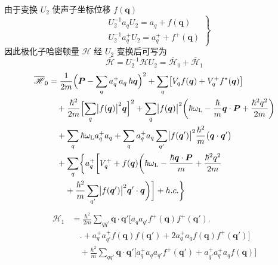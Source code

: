 由于变换 $U_{2}$ 使声子坐标位移 $f(\boldsymbol{q})$
\begin{equation}
\left.
\begin{aligned}
  &U_{2}^{-1}a_{q}U_{2}=a_{q}+f(\boldsymbol{q})\\
  &U_{2}^{-1}a_{q}^{+}U_{2}=a_{q}^{+}+f^{+}(\boldsymbol{q})
\end{aligned}\right\}
\end{equation}
因此极化子哈密顿量 $\mathscr{H}$ 经 $U_{2}$ 变换后可写为
\begin{equation}
  \overline{\mathscr{H}}=U_{2}^{-1}\mathscr{H}U_{2}
  =\overline{\mathscr{H}}_{0}+\overline{\mathscr{H}}_{1}
\end{equation}
\begin{equation}
\begin{aligned}
  \overline{\mathscr{H}}_{0}&=\frac{1}{2m}\Bigl(\boldsymbol{P}
  -\sum_{q}a_{q}^{+}a_{q}\,\hbar\boldsymbol{q}\Bigr)^{2}
  +\sum_{q}\bigl[V_{q}f(\boldsymbol{q})
  +V_{q}^{+}f^{*}(\boldsymbol{q})\bigr]\\
  &\quad+\frac{\hbar^{2}}{2m}\Bigl[\sum_{q}\bigl|f(\boldsymbol{q})\bigr|^{2}
  \boldsymbol{q}\Bigr]^{2}
  +\sum_{q}\bigl|f(\boldsymbol{q})\bigr|^{2}\biggl(\hbar\omega_{\mathrm L}
  -\frac{\hbar}{m}\boldsymbol{q}\cdot\boldsymbol{P}
  +\frac{\hbar^{2}q^{2}}{2m}\biggr)\\
  &\quad+\sum_{q}\hbar\omega_{\mathrm L}a_{q}^{+}a_{q}
  +\sum_{q}a_{q}^{+}a_{q}\sum_{q'}\bigl|f(\boldsymbol{q}')\bigr|^{2}
  \frac{\hbar^{2}}{m}\bigl(\boldsymbol{q}\cdot\boldsymbol{q}'\bigr)\\
  &\quad+\sum_{q}\biggl\{a_{q}^{+}\biggl[V_{q}^{+}+f(\boldsymbol{q})
  \biggl(\hbar\omega_{\mathrm L}-\frac{\hbar\boldsymbol{q}\cdot\boldsymbol{P}}{m}
  +\frac{\hbar^{2}q^{2}}{2m}\\
  &\qquad+\frac{\hbar^{2}}{m}\sum_{q'}\bigl|f(\boldsymbol{q}')\bigr|^{2}
  \boldsymbol{q}'\cdot\boldsymbol{q}\biggr)\biggr]+h.c.\biggr\}
\end{aligned}
\end{equation}
\begin{equation}
\begin{aligned}
  \mathscr{H}_{1}&=\frac{\hbar^{2}}{2m}\sum_{qq'}
  \boldsymbol{q}\cdot\boldsymbol{q}'
  \bigl[a_{q}a_{q'}f^{+}(\boldsymbol{q})f^{+}(\boldsymbol{q}')\bigr.\\
  &\quad\bigl.+a_{q}^{+}a_{q'}^{+}f(\boldsymbol{q})f(\boldsymbol{q}')
  +2a_{q}^{+}a_{q}f(\boldsymbol{q})f^{+}(\boldsymbol{q}')\bigr]\\
  &\quad+\frac{\hbar^{2}}{m}\sum_{qq'}\boldsymbol{q}\cdot\boldsymbol{q}'
  \bigl[a_{q}^{+}a_{q}a_{q'}f^{+}(\boldsymbol{q}')
  +a_{q'}^{+}a_{q}^{+}a_{q}f(\boldsymbol{q})\bigr]
\end{aligned}
\end{equation}
